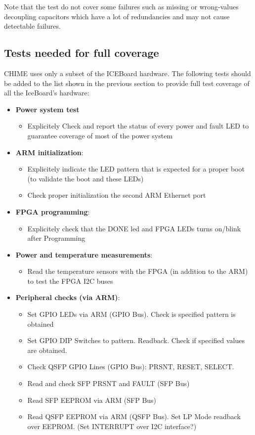 \documentclass[11pt,article]{memoir}
\begin{document}
Note that the test do not cover some failures such as missing or wrong-values decoupling capacitors which have a lot of redundancies and may not cause detectable failures.

\subsection{Tests needed for full coverage}

CHIME uses only a subset of the ICEBoard hardware. The following tests should be added to the list shown in the previous section
to provide full test coverage of all the IceBoard's hardware:

\begin{itemize}

\item \textbf{Power system test}
	\begin{itemize}
	\item Explicitely Check and report the status of every power and fault LED to guarantee coverage of most of the power system
	\end{itemize}

\item \textbf{ARM initialization}:
	\begin{itemize}
	\item Explicitely indicate the LED pattern that is expected for a proper boot (to validate the boot and these LEDs)
	\item Check proper initialization the second ARM Ethernet port
	\end{itemize}

\item \textbf{FPGA programming}:
	\begin{itemize}
	\item Explicitely check that the DONE led and FPGA LEDs turns on/blink after Programming
	\end{itemize}

\item \textbf{Power and temperature measurements}:
	\begin{itemize}
	\item Read the temperature sensors with the FPGA (in addition to the ARM) to test the FPGA I2C buses
	\end{itemize}


\item \textbf{Peripheral checks (via ARM)}:
	\begin{itemize}
	\item Set GPIO LEDs via ARM (GPIO Bus). Check is specified pattern is obtained
	\item Set GPIO DIP Switches to pattern. Readback. Check if specified values are obtained.
	\item Check QSFP GPIO Lines (GPIO Bus): PRSNT, RESET, SELECT.
	\item Read and check SFP PRSNT and FAULT (SFP Bus)
	\item Read SFP EEPROM via ARM (SFP Bus)
	\item Read QSFP EEPROM via ARM (QSFP Bus). Set LP Mode readback over EEPROM. (Set INTERRUPT over I2C interface?)
	\end{itemize}


\end{itemize}
\end{document}
